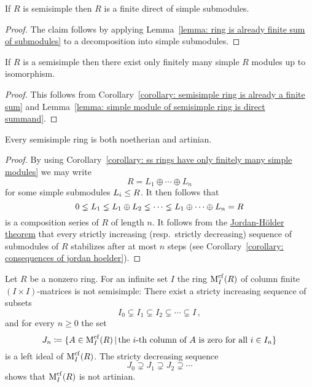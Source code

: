 \begin{corollary}
  \label{corollary: semisimple ring is already a finite sum}
  If $R$ is semisimple then $R$ is a finite direct of simple submodules.
\end{corollary}


\begin{proof}
 The claim follows by applying Lemma~\ref{lemma: ring is already finite sum of submodules} to a decomposition into simple submodules.
\end{proof}


\begin{corollary}
  \label{corollary: ss rings have only finitely many simple modules}
  If $R$ is a semisimple then there exist only finitely many simple $R$ modules up to isomorphism.
\end{corollary}


\begin{proof}
  This follows from Corollary~\ref{corollary: semisimple ring is already a finite sum} and Lemma~\ref{lemma: simple module of semisimple ring is direct summand}.
\end{proof}


\begin{corollary}
  \label{corollary: semisimple rings are notherian artinian}
  Every semisimple ring is both noetherian and artinian.
\end{corollary}


\begin{proof}
  By using Corollary~\ref{corollary: ss rings have only finitely many simple modules} we may write
  \[
    R = L_1 \oplus \dotsb \oplus L_n
  \]
  for some simple submodules $L_i \leq R$.
  It then follows that
  \[
                0
    \lneq L_1
    \lneq L_1 \oplus L_2
    \lneq \dotsb
    \lneq L_1 \oplus \dotsb \oplus L_n
    =           R
  \]
  is a composition series of $R$ of length $n$.
  It follows from the \hyperref[theorem: jordan hoelder theorem]{Jordan-Hölder theorem} that every strictly increasing (resp.\ strictly decreasing) sequence of submodules of $R$ stabilizes after at most $n$ steps (see Corollary~\ref{corollary: consequences of jordan hoelder}).
\end{proof}


\begin{example}
  \label{example: infinite matrix ring not semisimple}
  Let $R$ be a nonzero ring.
  For an infinite set $I$ the ring $\operatorname{M}_I^{{\operatorname{cf}}}(R)$ of column finite $(I \times I)$-matrices is not semisimple:
  There exist a stricty increasing sequence of subsets
  \[
                I_0
    \subsetneq  I_1
    \subsetneq  I_2
    \subsetneq  \dotsb
    \subsetneq  I \,,
  \]
  and for every $n \geq 0$ the set
  \[
              J_n
    \defined  \{
                A \in \Mat_I^{\cf}(R)
              \suchthat
                \text{the $i$-th column of $A$ is zero for all $i \in I_n$}
              \}
  \]
  is a left ideal of $\operatorname{M}_I^{{\operatorname{cf}}}(R)$.
  The stricty decreasing sequence
  \[
                J_0
    \supsetneq  J_1
    \supsetneq  J_2
    \supsetneq  \dotsb
  \]
  shows that $\operatorname{M}_I^{{\operatorname{cf}}}(R)$ is not artinian.
\end{example}





